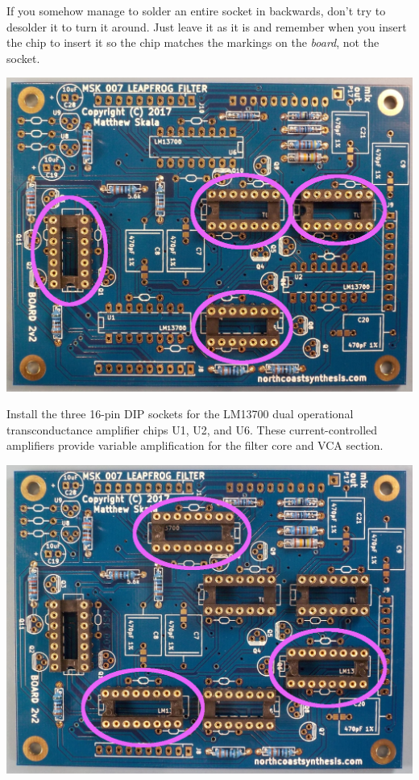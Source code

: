 If you somehow manage to solder an entire socket in backwards, don't try to
desolder it to turn it around.  Just leave it as it is and remember
when you insert the chip to insert it so the chip matches the
markings on the \emph{board}, not the socket.

\noindent\includegraphics[width=\linewidth]{dip14-2.jpg}

Install the three 16-pin DIP sockets for the LM13700 dual operational
transconductance amplifier chips U1, U2, and U6.  These current-controlled
amplifiers provide variable amplification for the filter core and VCA
section.

\noindent\includegraphics[width=\linewidth]{dip16-2.jpg}

